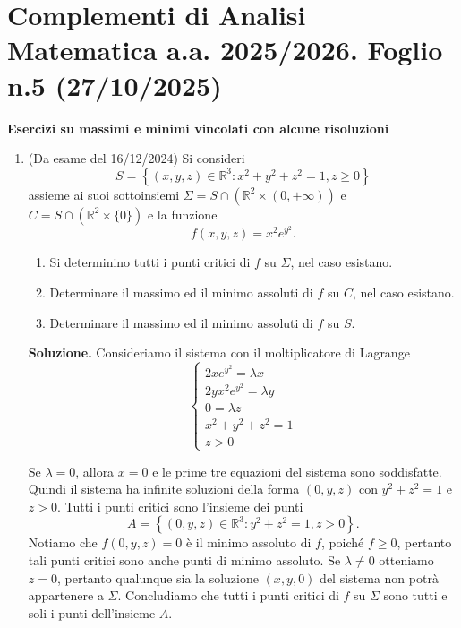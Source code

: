 \section*{Complementi di Analisi Matematica a.a. 2025/2026. Foglio n.5 (27/10/2025)}

\textbf{Esercizi su massimi e minimi vincolati con alcune risoluzioni}

\begin{enumerate}
	\item (Da esame del 16/12/2024) Si consideri
	\[
	S = \left\{(x,y,z) \in \mathbb{R}^3 : x^2 + y^2 + z^2 = 1, z \geq 0\right\}
	\]
	assieme ai suoi sottoinsiemi $\Sigma = S \cap \left(\mathbb{R}^2 \times (0,+\infty)\right)$ e $C = S \cap \left(\mathbb{R}^2 \times \{0\}\right)$ e la funzione
	\[
	f(x,y,z) = x^2 e^{y^2}.
	\]
	\begin{enumerate}
		\item Si determinino tutti i punti critici di $f$ su $\Sigma$, nel caso esistano.
		\item Determinare il massimo ed il minimo assoluti di $f$ su $C$, nel caso esistano.
		\item Determinare il massimo ed il minimo assoluti di $f$ su $S$.
	\end{enumerate}
	
	\textbf{Soluzione.}
		Consideriamo il sistema con il moltiplicatore di Lagrange
		\[
		\begin{cases}
			2x e^{y^2} = \lambda x \\
			2y x^2 e^{y^2} = \lambda y \\
			0 = \lambda z \\
			x^2 + y^2 + z^2 = 1 \\
			z > 0
		\end{cases}
		\]
		
		Se $\lambda = 0$, allora $x = 0$ e le prime tre equazioni del sistema sono soddisfatte. Quindi il sistema ha infinite soluzioni della forma $(0,y,z)$ con $y^2 + z^2 = 1$ e $z > 0$. Tutti i punti critici sono l'insieme dei punti
		\[
		A = \left\{(0,y,z) \in \mathbb{R}^3 : y^2 + z^2 = 1, z > 0\right\}.
		\]
		Notiamo che $f(0,y,z) = 0$ è il minimo assoluto di $f$, poiché $f \geq 0$, pertanto tali punti critici sono anche punti di minimo assoluto. Se $\lambda \neq 0$ otteniamo $z = 0$, pertanto qualunque sia la soluzione $(x,y,0)$ del sistema non potrà appartenere a $\Sigma$. Concludiamo che tutti i punti critici di $f$ su $\Sigma$ sono tutti e soli i punti dell'insieme $A$.
		

\end{enumerate}
